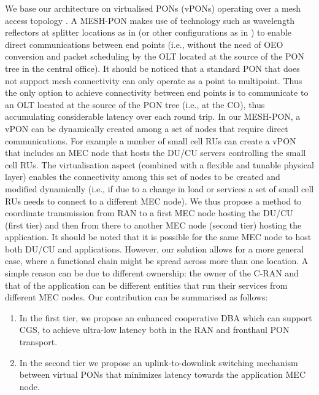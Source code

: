 \documentclass[a4paper, oneside, twocolumn, notitlepage, 10pt]{extarticle_ecoc}
\begin{document}
    We base our architecture on virtualised PONs (vPONs) operating over a mesh access topology \cite{MESH-Networks}. A MESH-PON makes use of technology such as wavelength reflectors at splitter locations as in \cite{MESH-JOCN} (or other configurations as in \cite{Wong,Pfeiffer}) to enable direct communications between end points (i.e., without the need of OEO conversion and packet scheduling by the OLT located at the source of the PON tree in the central office). It should be noticed that a standard PON that does not support mesh connectivity can only operate as a point to multipoint. Thus the only option to achieve connectivity between end points is to communicate to an OLT located at the source of the PON tree (i.e., at the CO), thus accumulating considerable latency over each round trip. In our MESH-PON, a vPON can be dynamically created among a set of nodes that require direct communications. For example a number of small cell RUs can create a vPON that includes an MEC node that hosts the DU/CU servers controlling the small cell RUs. The virtualisation aspect (combined with a flexible and tunable physical layer) enables the connectivity among this set of nodes to be created and modified dynamically (i.e., if due to a change in load or services a set of small cell RUs needs to connect to a different MEC node). We thus propose a method to coordinate transmission from RAN to a first MEC node hosting the DU/CU (first tier) and then from there to another MEC node (second tier) hosting the application. %
    It should be noted that it is possible for the same MEC node to host both DU/CU and applications. However, our solution allows for a more general case, where a functional chain might be spread across more than one location. A simple reason can be due to different ownership: the owner of the C-RAN and that of the application can be different entities that run their services from different MEC nodes.  %
    Our contribution can be summarised as follows:
    \begin{enumerate}
 		\item In the first tier, we propose an enhanced cooperative DBA which can support CGS, to achieve ultra-low latency both in the RAN and fronthaul PON transport.
 		\item In the second tier we propose an uplink-to-downlink switching mechanism between virtual PONs that minimizes latency towards the application MEC node. %
 	\end{enumerate}  
    
\end{document}
